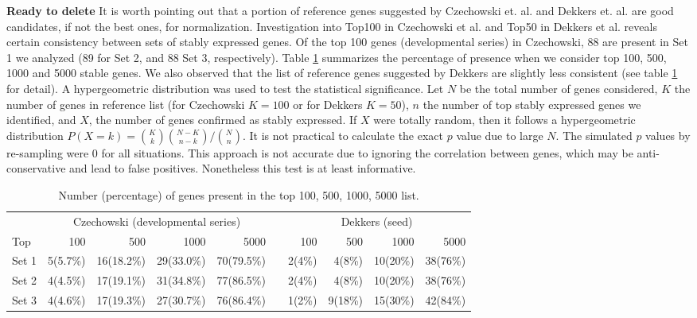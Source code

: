 \documentclass[11pt, a4paper]{article}
\begin{document}
\textbf{Ready to delete}
It is worth pointing out that a  portion of reference genes suggested by Czechowski et. al. and Dekkers et. al. are good  candidates, if not the best ones,  for normalization. Investigation into Top100 in Czechowski et al. and Top50 in Dekkers et al. reveals certain consistency between sets of stably expressed genes. Of the top 100 genes (developmental series) in  Czechowski, 88 are present in Set 1 we analyzed (89 for Set 2, and 88  Set 3, respectively). Table \ref{table:stablegenerank} summarizes the percentage of presence when we consider top 100, 500, 1000 and 5000 stable genes.  We also observed that the list of reference genes suggested by Dekkers are slightly less consistent (see table \ref{table:stablegenerank} for detail). A hypergeometric distribution was used to test the statistical significance. Let $N$ be the total number of genes considered, $K$ the number of genes in reference list (for Czechowski $K=100$ or for Dekkers $K=50$), $n$ the number of top stably expressed genes we identified,  and $X$, the number of genes confirmed as stably expressed.  If $X$ were totally random, then it follows a hypergeometric distribution $P(X = k) = {K \choose k}{N-K \choose n-k}/{N\choose n}$. It is not practical to calculate the exact $p$ value due to large $N$. The simulated $p$ values by re-sampling  were 0 for all situations. This approach is not accurate due to ignoring the correlation between genes, which may be anti-conservative and lead to false positives. Nonetheless this test is at least informative.  
\begin{table}[ht]
	\label{table:stablegenerank}
	\begin{tabular}{lrrrr r rrrr} \hline
		& \multicolumn{4}{c}{Czechowski (developmental series)} & & \multicolumn{4}{c}{Dekkers (seed)} \\ \cmidrule(r){2-10}
		Top   &   100  & 500     & 1000     & 5000  &  & 100    & 500    & 1000    & 5000    \\ \hline
		Set 1 &  5(5.7\%)   & 16(18.2\%)  & 29(33.0\%)  &70(79.5\%)  & &2(4\%)  &  4(8\%)  &10(20\%) & 38(76\%)   \\
		Set 2 & 4(4.5\%)    &17(19.1\%)   & 31(34.8\%)  &77(86.5\%) & &2(4\%)  &  4(8\%)  &10(20\%) & 38(76\%)   \\
		Set 3 &4(4.6\%)     &17(19.3\%)   &27(30.7\%)   &76(86.4\%) &  &1(2\%) & 9(18\%) &15(30\%)  & 42(84\%) \\ \hline 
	\end{tabular}
	\caption{Number (percentage) of genes present in the top 100, 500, 1000, 5000 list. }
\end{table}
\end{document}
